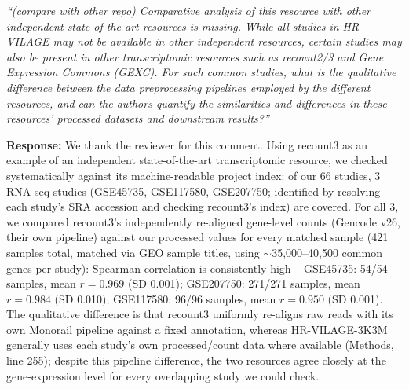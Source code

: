 \documentclass[11pt]{article}
\newcommand{\origcomment}[1]{\textit{``#1''}}
\newcommand{\filledresponse}[1]{%
  \par\medskip\noindent\textbf{Response:} #1\par
  \vspace{0.4cm}%
  \par\noindent\hrulefill\par\bigskip
}
\begin{document}
\begin{commentlist}
\item[R2-3.] \origcomment{(compare with other repo) Comparative analysis of this resource with
other independent state-of-the-art resources is missing. While all studies in HR-VILAGE may not
be available in other independent resources, certain studies may also be present in other
transcriptomic resources such as recount2/3 and Gene Expression Commons (GEXC). For such common
studies, what is the qualitative difference between the data preprocessing pipelines employed by
the different resources, and can the authors quantify the similarities and differences in these
resources' processed datasets and downstream results?}
\filledresponse{We thank the reviewer for this comment. Using recount3 as an example of an
independent state-of-the-art transcriptomic resource, we checked systematically against its
machine-readable project index: of our 66 studies, 3 RNA-seq studies
(GSE45735, GSE117580, GSE207750; identified by resolving each study's SRA accession and checking
recount3's index) are covered. For all 3, we compared recount3's independently re-aligned
gene-level counts (Gencode v26, their own pipeline) against our processed values for every
matched sample (421 samples total, matched via GEO sample titles, using $\sim$35,000--40,500
common genes per study): Spearman correlation is consistently high -- GSE45735: 54/54 samples,
mean $r=0.969$ (SD 0.001); GSE207750: 271/271 samples, mean $r=0.984$ (SD 0.010); GSE117580:
96/96 samples, mean $r=0.950$ (SD 0.001). The qualitative difference is that recount3 uniformly
re-aligns raw reads with its own Monorail pipeline against a fixed annotation, whereas HR-VILAGE-3K3M
generally uses each study's own processed/count data where available (Methods, line 255); despite
this pipeline difference, the two resources agree closely at the gene-expression level for every
overlapping study we could check.}


\end{commentlist}
\end{document}
